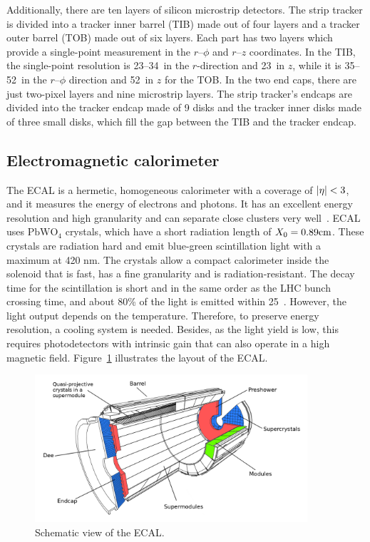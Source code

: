 Additionally, there are ten layers of silicon microstrip detectors. The strip tracker is divided into a tracker inner barrel (TIB) made out of four layers and a tracker outer barrel (TOB) made out of six layers. Each part has two layers which provide a single-point measurement in the $r$--$\phi$ and $r$--$z$ coordinates. In the TIB, the single-point resolution is 23--34~\mum in the $r$-direction and 23~\mum in $z$, while it is 35--52~\mum in the $r$--$\phi$ direction and 52~\mum in $z$ for the TOB. In the two end caps, there are just two-pixel layers and nine microstrip layers. The strip tracker's endcaps are divided into the tracker endcap made of 9 disks and the tracker inner disks made of three small disks, which fill the gap between the TIB and the tracker endcap.

\subsection{Electromagnetic calorimeter}

The ECAL is a hermetic, homogeneous calorimeter with a coverage of $\lvert\eta\rvert < 3$, and it measures the energy of electrons and photons. It has an excellent energy resolution and high granularity and can separate close clusters very well~\cite{CMS:2010bta, Khachatryan:2015hwa}. ECAL uses $\text{PbWO}_4$ crystals, which have a short radiation length of $X_0 = 0.89 \text{cm}$. These crystals are radiation hard and emit blue-green scintillation light with a maximum at 420 nm. The crystals allow a compact calorimeter inside the solenoid that is fast, has a fine granularity and is radiation-resistant. The decay time for the scintillation is short and in the same order as the LHC bunch crossing time, and about 80\% of the light is emitted within 25~\ns. However, the light output depends on the temperature. Therefore, to preserve energy resolution, a cooling system is needed. Besides, as the light yield is low, this requires photodetectors with intrinsic gain that can also operate in a high magnetic field. Figure~\ref{fig:ecal} illustrates the layout of the ECAL.

\begin{figure}[htbp]
  \centering
  \includegraphics[width=0.9\textwidth]{plots/chapter3/ecal.png}
  \caption{Schematic view of the ECAL.}
  \label{fig:ecal}
\end{figure}

